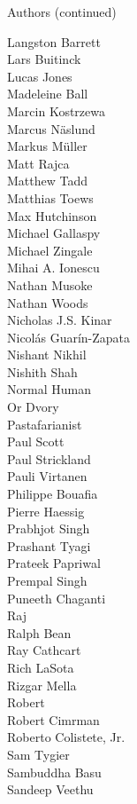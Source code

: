 \begin{frame}{Authors (continued)}
\begin{multicols}{5}
\tiny
Langston Barrett\\
Lars Buitinck\\
Lucas Jones\\
Madeleine Ball\\
Marcin Kostrzewa\\
Marcus Näslund\\
Markus Müller\\
Matt Rajca\\
Matthew Tadd\\
Matthias Toews\\
Max Hutchinson\\
Michael Gallaspy\\
Michael Zingale\\
Mihai A. Ionescu\\
Nathan Musoke\\
Nathan Woods\\
Nicholas J.S. Kinar\\
Nicolás Guarín-Zapata\\
Nishant Nikhil\\
Nishith Shah\\
Normal Human\\
Or Dvory\\
Pastafarianist\\
Paul Scott\\
Paul Strickland\\
Pauli Virtanen\\
Philippe Bouafia\\
Pierre Haessig\\
Prabhjot Singh\\
Prashant Tyagi\\
Prateek Papriwal\\
Prempal Singh\\
Puneeth Chaganti\\
Raj\\
Ralph Bean\\
Ray Cathcart\\
Rich LaSota\\
Rizgar Mella\\
Robert\\
Robert Cimrman\\
Roberto Colistete, Jr.\\
Sam Tygier\\
Sambuddha Basu\\
Sandeep Veethu\\

\end{multicols}
\end{frame}
